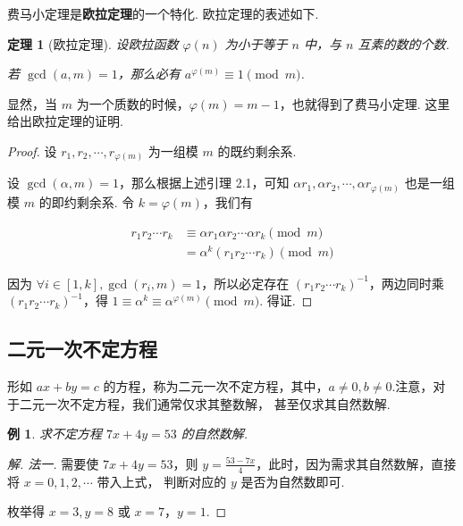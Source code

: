 \documentclass[a4paper]{article}
\newtheorem{theorem}{定理}[section]
\newtheorem{exam}{例}[subsection]
\begin{document}
费马小定理是\textbf{欧拉定理}的一个特化. 欧拉定理的表述如下.

\begin{theorem}[欧拉定理]
    设欧拉函数 $\varphi(n)$ 为小于等于 $n$ 中，与 $n$ 互素的数的个数.

    若 $\gcd(a,m)=1$，那么必有 $a^{\varphi(m)}\equiv 1\pmod m$.
\end{theorem}

显然，当 $m$ 为一个质数的时候，$\varphi(m)=m-1$，也就得到了费马小定理. 这里给出欧拉定理的证明.

\begin{proof}
    设 $r_1,r_2,\cdots,r_{\varphi(m)}$ 为一组模 $m$ 的既约剩余系.

    设 $\gcd(\alpha,m)=1$，那么根据上述引理 2.1，可知 $\alpha r_1,\alpha r_2,\cdots,\alpha r_{\varphi(m)}$
    也是一组模 $m$ 的即约剩余系. 令 $k=\varphi(m)$，我们有

    \begin{equation*}
        \begin{split}
            r_1r_2\cdots r_k&\equiv \alpha r_1\alpha r_2\cdots \alpha r_k \pmod m\\
            &=\alpha^k(r_1r_2\cdots r_k)\pmod m
        \end{split}
    \end{equation*}

    因为 $\forall i\in[1,k],\gcd(r_i,m)=1$，所以必定存在 $(r_1r_2\cdots r_k)^{-1}$，两边同时乘 $(r_1r_2
        \cdots r_k)^{-1}$，得 $1\equiv \alpha^k \equiv\alpha^{\varphi(m)}\pmod m$. 得证.
\end{proof}

\subsection{二元一次不定方程}

形如 $ax+by=c$ 的方程，称为二元一次不定方程，其中，$a\ne 0,b\ne 0$.注意，对于二元一次不定方程，我们通常仅求其整数解，
甚至仅求其自然数解.

\begin{exam}
    求不定方程 $7x+4y=53$ 的自然数解.
\end{exam}

\begin{proof}[解. 法一]
    需要使 $7x+4y=53$，则 $y=\frac{53-7x}{4}$，此时，因为需求其自然数解，直接将 $x=0,1,2,\cdots$ 带入上式，
    判断对应的 $y$ 是否为自然数即可.

    枚举得 $x=3,y=8$ 或 $x=7$，$y=1$.
\end{proof}
\end{document}

